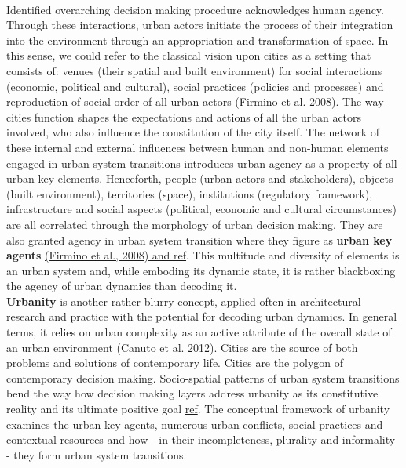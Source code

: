 \documentclass[11pt]{report}
\begin{document}
\\
Identified overarching decision making procedure acknowledges human agency. Through these interactions, urban actors initiate the process of their integration into the environment through an appropriation and transformation of space. In this sense, we could refer to the classical vision upon cities as a setting that consists of: venues (their spatial and built environment) for social interactions (economic, political and cultural), social practices (policies and processes) and reproduction of social order of all urban actors (Firmino et al. 2008). The way cities function shapes the expectations and actions of all the urban actors involved, who also influence the constitution of the city itself. The network of these internal and external influences between human and non-human elements engaged in urban system transitions introduces urban agency as a property of all urban key elements. Henceforth, people (urban actors and stakeholders), objects (built environment), territories (space), institutions (regulatory framework), infrastructure and social  aspects (political, economic and cultural circumstances) are all correlated through the morphology of urban decision making. They are also granted agency in urban system transition where they figure as \textbf{urban key agents} \href{}{(Firmino et al., 2008) and ref}. This multitude and diversity of elements is an urban system and, while emboding its dynamic state, it is rather blackboxing the agency of urban dynamics than decoding it.
\\
\textbf{Urbanity} is another rather blurry concept, applied often in architectural research and practice with the potential for decoding urban dynamics. In general terms, it relies on urban complexity as an active attribute of the overall state of an urban environment (Canuto et al. 2012). Cities are the source of both problems and solutions of contemporary life. Cities are the polygon of contemporary decision making. Socio-spatial patterns of urban system transitions bend the way how decision making layers address urbanity as its constitutive reality and its ultimate positive goal \href{}{ref}. The conceptual framework of urbanity examines the urban key agents, numerous urban conflicts, social practices and contextual resources and how - in their incompleteness, plurality and informality - they form urban system transitions.
\\
\end{document}
